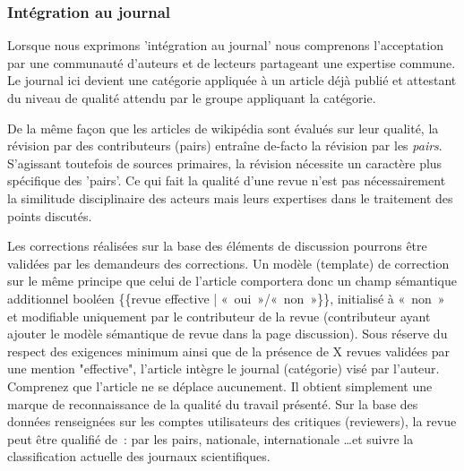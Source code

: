 \subsubsection{Intégration au journal}
Lorsque nous exprimons 'intégration au journal' nous comprenons l'acceptation par une communauté d'auteurs et de lecteurs partageant une expertise commune.
Le journal ici devient une catégorie appliquée à un article déjà publié et attestant du niveau de qualité attendu par le groupe appliquant la catégorie.

De la même façon que les articles de wikipédia sont évalués sur leur qualité, la révision par des contributeurs (pairs) entraîne de-facto la révision par les \textit{pairs}.
S'agissant toutefois de sources primaires, la révision nécessite un caractère plus spécifique des 'pairs'.
Ce qui fait la qualité d'une revue n'est pas nécessairement la similitude disciplinaire des acteurs mais leurs expertises dans le traitement des points discutés.

Les corrections réalisées sur la base des éléments de discussion pourrons être validées par les demandeurs des corrections.
Un modèle (template) de correction sur le même principe que celui de l'article comportera donc un champ sémantique additionnel booléen \{\{revue effective | «~oui~»/«~non~»\}\}, initialisé à «~non~» et modifiable uniquement par le contributeur de la revue (contributeur ayant ajouter le modèle sémantique de revue dans la page discussion).
Sous réserve du respect des exigences minimum ainsi que de la présence de X revues validées par une mention "effective", l'article intègre le journal (catégorie) visé par l'auteur.
Comprenez que l'article ne se déplace aucunement.
Il obtient simplement une marque de reconnaissance de la qualité du travail présenté.
Sur la base des données renseignées sur les comptes utilisateurs des critiques (reviewers), la revue peut être qualifié de~: par les pairs, nationale, internationale \ldots et suivre la classification actuelle des journaux scientifiques.

